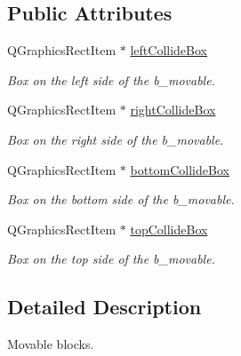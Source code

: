 \subsection*{Public Attributes}
\begin{DoxyCompactItemize}
\item 
\hypertarget{class_b___movable_ab838f983e5e7b13148fc7f4873f2c347}{}Q\+Graphics\+Rect\+Item $\ast$ \hyperlink{class_b___movable_ab838f983e5e7b13148fc7f4873f2c347}{left\+Collide\+Box}\label{class_b___movable_ab838f983e5e7b13148fc7f4873f2c347}

\begin{DoxyCompactList}\small\item\em Box on the left side of the b\+\_\+movable. \end{DoxyCompactList}\item 
\hypertarget{class_b___movable_a5da8e8b462e4504f219857a3e007ad97}{}Q\+Graphics\+Rect\+Item $\ast$ \hyperlink{class_b___movable_a5da8e8b462e4504f219857a3e007ad97}{right\+Collide\+Box}\label{class_b___movable_a5da8e8b462e4504f219857a3e007ad97}

\begin{DoxyCompactList}\small\item\em Box on the right side of the b\+\_\+movable. \end{DoxyCompactList}\item 
\hypertarget{class_b___movable_a6ad546481827dc987708ad36023ba21b}{}Q\+Graphics\+Rect\+Item $\ast$ \hyperlink{class_b___movable_a6ad546481827dc987708ad36023ba21b}{bottom\+Collide\+Box}\label{class_b___movable_a6ad546481827dc987708ad36023ba21b}

\begin{DoxyCompactList}\small\item\em Box on the bottom side of the b\+\_\+movable. \end{DoxyCompactList}\item 
\hypertarget{class_b___movable_a0609a13a4c686a8c7a4a0edb5e87efbf}{}Q\+Graphics\+Rect\+Item $\ast$ \hyperlink{class_b___movable_a0609a13a4c686a8c7a4a0edb5e87efbf}{top\+Collide\+Box}\label{class_b___movable_a0609a13a4c686a8c7a4a0edb5e87efbf}

\begin{DoxyCompactList}\small\item\em Box on the top side of the b\+\_\+movable. \end{DoxyCompactList}\end{DoxyCompactItemize}


\subsection{Detailed Description}
Movable blocks. 


